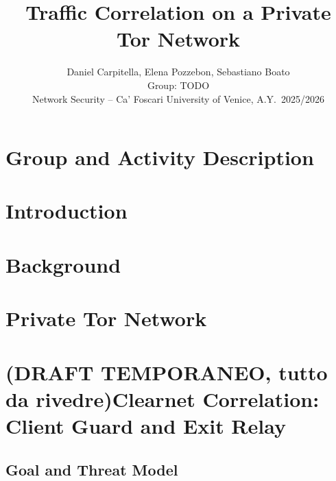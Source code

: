 \documentclass[10pt,a4paper]{article}
\title{\textbf{Traffic Correlation on a Private Tor Network}}
\author{Daniel Carpitella, Elena Pozzebon, Sebastiano Boato\\
Group: TODO\\
Network Security -- Ca' Foscari University of Venice, A.Y.\ 2025/2026}
\date{}
\numberwithin{figure}{section}
\numberwithin{table}{section}
\begin{document}
\maketitle

\begin{abstract}
\normalsize
\end{abstract}
\newpage

\section{Group and Activity Description}
\label{sec:group}
\section{Introduction}
\label{sec:introduction}
\section{Background}
\label{sec:background}
\section{Private Tor Network}
\label{sec:lab}
\section{(DRAFT TEMPORANEO, tutto da rivedre)Clearnet Correlation: Client Guard and Exit Relay}
\label{sec:clearnet}

\subsection{Goal and Threat Model}
\label{sec:clearnet-goal}
\end{document}
